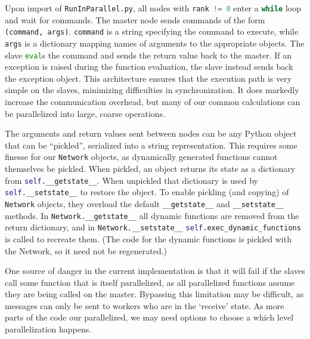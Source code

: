 \documentclass[12pt]{article}
\makeatletter
\newcommand{\py}[1]{\lstinline[language=Python, showstringspaces=False]@#1@}
\makeatother
\begin{document}
Upon import of \py{RunInParallel.py}, all nodes with \py{rank != 0} enter a \py{while} loop and wait for commands.
The master node sends commands of the form \py{(command, args)}.
\py{command} is a string specifying the command to execute, while \py{args} is a dictionary mapping names of arguments to the appropriate objects.
The slave \py{eval}s the command and sends the return value back to the master.
If an exception is raised during the function evaluation, the slave instead sends back the exception object.
This architecture ensures that the execution path is very simple on the slaves, minimizing difficulties in synchronization.
It does markedly increase the communication overhead, but many of our common calculations can be parallelized into large, coarse operations.

The arguments and return values sent between nodes can be any Python object that can be ``pickled'', serialized into a string representation.
This requires some finesse for our \py{Network} objects, as dynamically generated functions cannot themselves be pickled.
When pickled, an object returns its state as a dictionary from \py{self.__getstate__}.
When unpickled that dictionary is used by \py{self.__setstate__} to restore the object.
To enable pickling (and copying) of \py{Network} objects, they overload the default \py{__getstate__} and \py{__setstate__} methods.
In \py{Network.__getstate__} all dynamic functions are removed from the return dictionary, and in \py{Network.__setstate__} \py{self.exec_dynamic_functions} is called to recreate them.
(The code for the dynamic functions is pickled with the Network, so it need not be regenerated.)

One source of danger in the current implementation is that it will fail if the slaves call some function that is itself parallelized, as all parallelized functions assume they are being called on the master.
Bypassing this limitation may be difficult, as messages can only be sent to workers who are in the `receive' state.
As more parts of the code our parallelized, we may need options to choose a which level parallelization happens.



\end{document}
